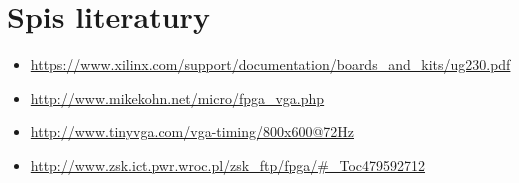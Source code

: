 \documentclass[a4paper]{article}
\begin{document}
\section{Spis literatury}
\begin{itemize}
\item \url{https://www.xilinx.com/support/documentation/boards_and_kits/ug230.pdf}
\item \url{http://www.mikekohn.net/micro/fpga_vga.php}
\item \url{http://www.tinyvga.com/vga-timing/800x600@72Hz}
\item \url{http://www.zsk.ict.pwr.wroc.pl/zsk_ftp/fpga/#_Toc479592712}

\end{itemize}
\end{document}
